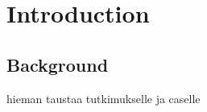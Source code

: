 \documentclass[12pt,a4paper,oneside,pdftex]{report}
\begin{document}
{{%


\cleardoublepage
\tableofcontents



\label{pages-prelude}
\cleardoublepage

\startfirstchapter

\pagestyle{headings}


% 

\chapter{Introduction}
\label{chapter:intro}






\section{Background}

hieman taustaa tutkimukselle ja caselle

}}
\end{document}
